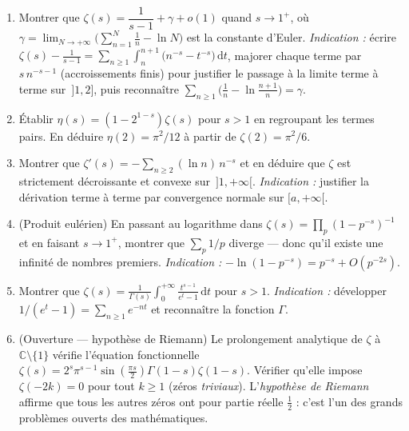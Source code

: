 \begin{mdframed}[style=exobar]
  \begin{enumerate}
    \item Montrer que $\zeta(s)=\dfrac{1}{s-1}+\gamma+o(1)$ quand $s\to 1^{+}$,
          où $\gamma=\lim_{N\to+\infty}\bigl(\sum_{n=1}^{N}\tfrac{1}{n}-\ln N\bigr)$
          est la constante d'Euler.
          \textit{Indication :} écrire
          $\zeta(s)-\tfrac{1}{s-1}=\sum_{n\geq 1}\int_{n}^{n+1}
          \bigl(n^{-s}-t^{-s}\bigr)\,\mathrm{d}t$, majorer chaque terme par
          $s\,n^{-s-1}$ (accroissements finis) pour justifier le passage à la
          limite terme à terme sur $\,]1,2]$, puis reconnaître
          $\sum_{n\geq 1}\bigl(\tfrac{1}{n}-\ln\tfrac{n+1}{n}\bigr)=\gamma$.

    \item Établir $\eta(s)=(1-2^{1-s})\zeta(s)$ pour $s>1$ en regroupant les termes
          pairs. En déduire $\eta(2)=\pi^{2}/12$ à partir de $\zeta(2)=\pi^{2}/6$.

    \item Montrer que $\zeta'(s)=-\sum_{n\geq 2}(\ln n)\,n^{-s}$ et en déduire que
          $\zeta$ est strictement décroissante et convexe sur $\,]1,+\infty[$.
          \textit{Indication :} justifier la dérivation terme à terme par
          convergence normale sur $[a,+\infty[$.

    \item (Produit eulérien) En passant au logarithme dans
          $\zeta(s)=\prod_{p}(1-p^{-s})^{-1}$ et en faisant $s\to 1^{+}$, montrer
          que $\sum_{p}1/p$ diverge — donc qu'il existe une infinité de nombres
          premiers. \textit{Indication :} $-\ln(1-p^{-s})=p^{-s}+O(p^{-2s})$.

    \item Montrer que $\displaystyle\zeta(s)=\frac{1}{\Gamma(s)}\int_{0}^{+\infty}
          \frac{t^{s-1}}{e^{t}-1}\,\mathrm{d}t$ pour $s>1$.
          \textit{Indication :} développer $1/(e^{t}-1)=\sum_{n\geq 1}e^{-nt}$ et
          reconnaître la fonction $\Gamma$.

    \item (Ouverture — hypothèse de Riemann)
          Le prolongement analytique de $\zeta$ à $\mathbb{C}\setminus\{1\}$
          vérifie l'équation fonctionnelle
          $\zeta(s)=2^{s}\pi^{s-1}\sin(\tfrac{\pi s}{2})\Gamma(1-s)\zeta(1-s)$.
          Vérifier qu'elle impose $\zeta(-2k)=0$ pour tout $k\geq 1$ (zéros
          \emph{triviaux}). L'\emph{hypothèse de Riemann} affirme que tous les
          autres zéros ont pour partie réelle $\tfrac{1}{2}$ : c'est l'un des
          grands problèmes ouverts des mathématiques.
  \end{enumerate}
\end{mdframed}

